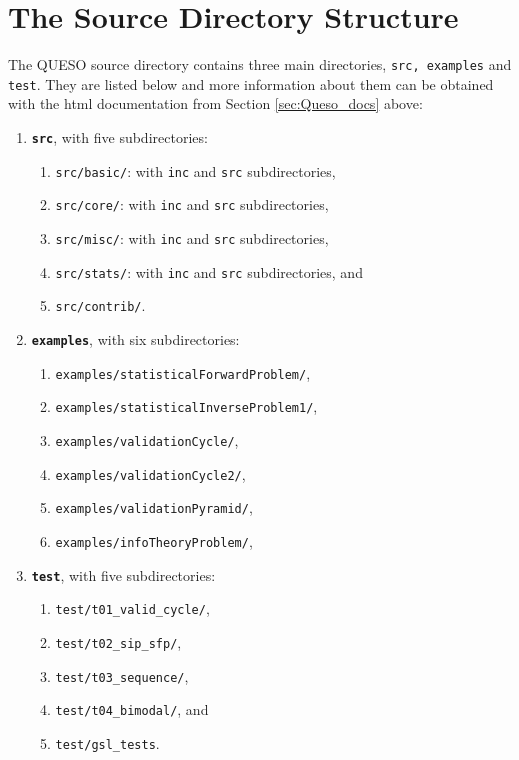 \section{The Source Directory Structure} \label{sc-source-dir-structure}

The QUESO source directory contains three main directories, \texttt{src, examples} and \texttt{test}. They are listed below and more
information about them can be obtained with the html documentation from Section \ref{sec:Queso_docs} above:
\begin{enumerate}
\item \texttt{\bf src}, with five subdirectories:
\begin{enumerate}
\item \texttt{src/basic/}: with \texttt{inc} and \texttt{src} subdirectories,
\item \texttt{src/core/}:  with \texttt{inc} and \texttt{src} subdirectories,
\item \texttt{src/misc/}:  with \texttt{inc} and \texttt{src} subdirectories,
\item \texttt{src/stats/}: with \texttt{inc} and \texttt{src} subdirectories, and
\item \texttt{src/contrib/}.
\end{enumerate}

\item \texttt{\bf examples}, with six subdirectories:
\begin{enumerate}
\item \texttt{examples/statisticalForwardProblem/},
\item \texttt{examples/statisticalInverseProblem1/},
\item \texttt{examples/validationCycle/}, 
\item \texttt{examples/validationCycle2/},
\item \texttt{examples/validationPyramid/},
\item \texttt{examples/infoTheoryProblem/},
\end{enumerate}

\item  \texttt{\bf test}, with five subdirectories:
\begin{enumerate}
\item \texttt{test/t01\_valid\_cycle/},
\item \texttt{test/t02\_sip\_sfp/},
\item \texttt{test/t03\_sequence/}, 
\item \texttt{test/t04\_bimodal/}, and
\item \texttt{test/gsl\_tests}.
\end{enumerate}

\end{enumerate}


